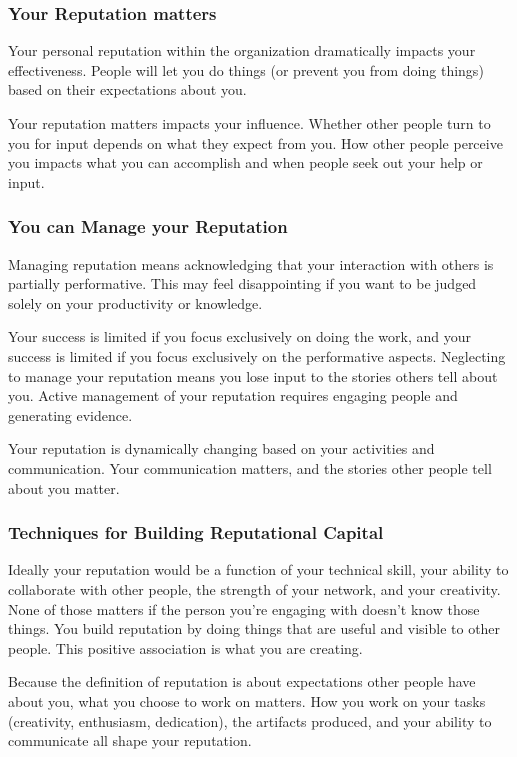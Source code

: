 \subsubsection{Your Reputation matters}

Your personal reputation within the organization dramatically impacts your effectiveness. People will let you do things (or prevent you from doing things) based on their expectations about you. 

Your reputation matters impacts your influence. Whether other people turn to you for input depends on what they expect from you. How other people perceive you impacts what you can accomplish and when people seek out your help or input.

\subsubsection{You can Manage your Reputation}

Managing reputation means acknowledging that your interaction with others is partially performative. This may feel disappointing if you want to be judged solely on your productivity or knowledge. 

Your success is limited if you focus exclusively on doing the work, and your success is limited if you focus exclusively on the performative aspects. 
Neglecting to manage your reputation means you lose input to the stories others tell about you. Active management of your reputation requires engaging people and generating evidence. 

Your reputation is dynamically changing based on your activities and communication. Your communication matters, and the stories other people tell about you matter.

\subsubsection{Techniques for Building Reputational Capital}

Ideally your reputation would be a function of your technical skill, your ability to collaborate with other people, the strength of your network, and your creativity. None of those matters if the person you're engaging with doesn't know those things. 
You build reputation by doing things that are useful and visible to other people. This positive association is what you are creating.

Because the definition of reputation is about expectations other people have about you, what you choose to work on matters. How you work on your tasks (creativity, enthusiasm, dedication), the artifacts produced, and your ability to communicate all shape your reputation. 

